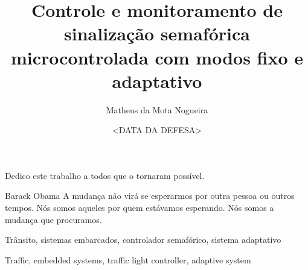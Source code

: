 \documentclass[bsc]{ufpethesis}
\institute{Centro de Tecnologia e Geociências}
\title{Controle e monitoramento de sinalização semafórica microcontrolada com modos fixo e adaptativo}
\date{<DATA DA DEFESA>}
\author{Matheus da Mota Nogueira}
\begin{document}
\frontmatter

\frontpage

\presentationpage

\begin{dedicatory}
    Dedico este trabalho a todos que o tornaram possível.
\end{dedicatory}

\acknowledgements
    

\begin{epigraph}{Barack Obama}
A mudança não virá se esperarmos por outra pessoa ou outros tempos. Nós somos aqueles por quem estávamos esperando. Nós somos a mudança que procuramos.
\end{epigraph}

\resumo

\begin{keywords}
    Trânsito, sistemas embarcados, controlador semafórico, sistema adaptativo
\end{keywords}

\abstract

\begin{keywords}
    Traffic, embedded systems, traffic light controller, adaptive system
\end{keywords}

\tableofcontents

\listoffigures

\listoftables



\mainmatter
\end{document}
